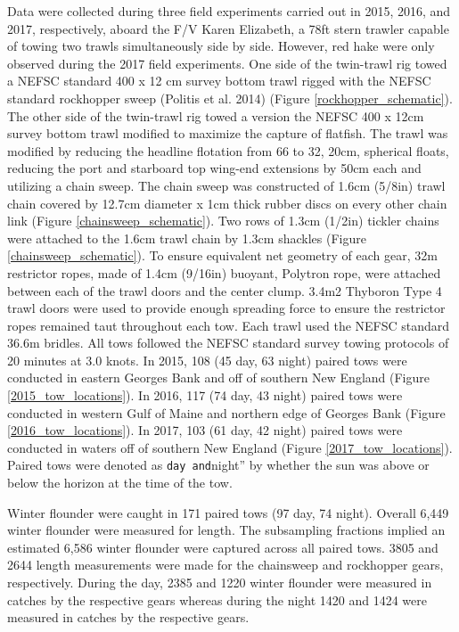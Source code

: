 \documentclass[]{article}
\begin{document}
Data were collected during three field experiments carried out in 2015,
2016, and 2017, respectively, aboard the F/V Karen Elizabeth, a 78ft
stern trawler capable of towing two trawls simultaneously side by side.
However, red hake were only observed during the 2017 field experiments.
One side of the twin-trawl rig towed a NEFSC standard 400 x 12 cm survey
bottom trawl rigged with the NEFSC standard rockhopper sweep (Politis et
al. 2014) (Figure \ref{rockhopper_schematic}). The other side of the
twin-trawl rig towed a version the NEFSC 400 x 12cm survey bottom trawl
modified to maximize the capture of flatfish. The trawl was modified by
reducing the headline flotation from 66 to 32, 20cm, spherical floats,
reducing the port and starboard top wing-end extensions by 50cm each and
utilizing a chain sweep. The chain sweep was constructed of 1.6cm
(5/8in) trawl chain covered by 12.7cm diameter x 1cm thick rubber discs
on every other chain link (Figure \ref{chainsweep_schematic}). Two rows
of 1.3cm (1/2in) tickler chains were attached to the 1.6cm trawl chain
by 1.3cm shackles (Figure \ref{chainsweep_schematic}). To ensure
equivalent net geometry of each gear, 32m restrictor ropes, made of
1.4cm (9/16in) buoyant, Polytron rope, were attached between each of the
trawl doors and the center clump. 3.4m2 Thyboron Type 4 trawl doors were
used to provide enough spreading force to ensure the restrictor ropes
remained taut throughout each tow. Each trawl used the NEFSC standard
36.6m bridles. All tows followed the NEFSC standard survey towing
protocols of 20 minutes at 3.0 knots. In 2015, 108 (45 day, 63 night)
paired tows were conducted in eastern Georges Bank and off of southern
New England (Figure \ref{2015_tow_locations}). In 2016, 117 (74 day, 43
night) paired tows were conducted in western Gulf of Maine and northern
edge of Georges Bank (Figure \ref{2016_tow_locations}). In 2017, 103 (61
day, 42 night) paired tows were conducted in waters off of southern New
England (Figure \ref{2017_tow_locations}). Paired tows were denoted as
\texttt{day\textquotesingle{}\textquotesingle{}\ and}night'' by whether
the sun was above or below the horizon at the time of the tow.

Winter flounder were caught in 171 paired tows (97 day, 74 night).
Overall 6,449 winter flounder were measured for length. The subsampling
fractions implied an estimated 6,586 winter flounder were captured
across all paired tows. 3805 and 2644 length measurements were made for
the chainsweep and rockhopper gears, respectively. During the day, 2385
and 1220 winter flounder were measured in catches by the respective
gears whereas during the night 1420 and 1424 were measured in catches by
the respective gears.
\end{document}
